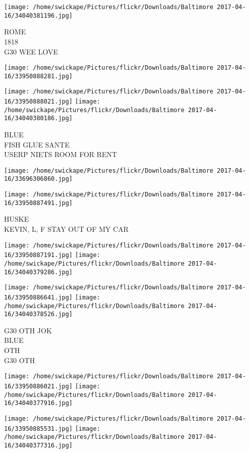 \documentclass[10pt,letterpaper]{article}
\begin{document}
\vspace{0.25in}
\texttt{[image: /home/swickape/Pictures/flickr/Downloads/Baltimore 2017-04-16/34040381196.jpg]}

ROME\\
1818\\
G30 WEE LOVE
\pagebreak

\texttt{[image: /home/swickape/Pictures/flickr/Downloads/Baltimore 2017-04-16/33950888281.jpg]}

\vspace{0.25in}
\texttt{[image: /home/swickape/Pictures/flickr/Downloads/Baltimore 2017-04-16/33950888021.jpg]}
\texttt{[image: /home/swickape/Pictures/flickr/Downloads/Baltimore 2017-04-16/34040380186.jpg]}

BLUE\\
FISH GLUE SANTE\\
USERP NIETS ROOM FOR RENT
\pagebreak

\texttt{[image: /home/swickape/Pictures/flickr/Downloads/Baltimore 2017-04-16/33696306860.jpg]}

\vspace{0.25in}
\texttt{[image: /home/swickape/Pictures/flickr/Downloads/Baltimore 2017-04-16/33950887491.jpg]}

HUSKE\\
KEVIN, L, F STAY OUT OF MY CAR
\pagebreak

\texttt{[image: /home/swickape/Pictures/flickr/Downloads/Baltimore 2017-04-16/33950887191.jpg]}
\texttt{[image: /home/swickape/Pictures/flickr/Downloads/Baltimore 2017-04-16/34040379286.jpg]}

\texttt{[image: /home/swickape/Pictures/flickr/Downloads/Baltimore 2017-04-16/33950886641.jpg]}
\texttt{[image: /home/swickape/Pictures/flickr/Downloads/Baltimore 2017-04-16/34040378526.jpg]}

G30 OTH JOK\\
BLUE\\
OTH\\
G30 OTH
\pagebreak

\texttt{[image: /home/swickape/Pictures/flickr/Downloads/Baltimore 2017-04-16/33950886021.jpg]}
\texttt{[image: /home/swickape/Pictures/flickr/Downloads/Baltimore 2017-04-16/34040377916.jpg]}

\texttt{[image: /home/swickape/Pictures/flickr/Downloads/Baltimore 2017-04-16/33950885531.jpg]}
\texttt{[image: /home/swickape/Pictures/flickr/Downloads/Baltimore 2017-04-16/34040377316.jpg]}
\end{document}
